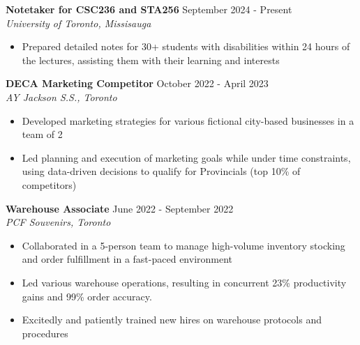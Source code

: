 \documentclass[letterpaper,10.5pt]{article}
\begin{document}
\noindent\textbf{Notetaker for CSC236 and STA256}
\hfill
September 2024 - Present\\
\emph{University of Toronto, Missisauga}
\hfill
\emph{}
\begin{itemize}
\setlength\itemsep{1pt}
\item Prepared detailed notes for 30+ students with disabilities within 24 hours of the lectures, assisting them with their learning and interests
\end{itemize}
\vspace{5pt}
\noindent\textbf{DECA Marketing Competitor}
\hfill
October 2022 - April 2023\\
\emph{AY Jackson S.S., Toronto}
\hfill
\emph{}
\begin{itemize}
\setlength\itemsep{1pt}
\item Developed marketing strategies for various fictional city-based businesses in a team of 2
\item Led planning and execution of marketing goals while under time constraints, using data-driven decisions to qualify for Provincials (top 10\% of competitors)
\end{itemize}
\vspace{5pt}
\noindent\textbf{Warehouse Associate}
\hfill
June 2022 - September 2022\\
\emph{PCF Souvenirs, Toronto}
\hfill
\emph{}
\begin{itemize}
\setlength\itemsep{1pt}
\item Collaborated in a 5-person team to manage high-volume inventory stocking and order fulfillment in a fast-paced environment
\item Led various warehouse operations, resulting in concurrent 23\% productivity gains and 99\% order accuracy.
\item Excitedly and patiently trained new hires on warehouse protocols and procedures
\end{itemize}
\end{document}
